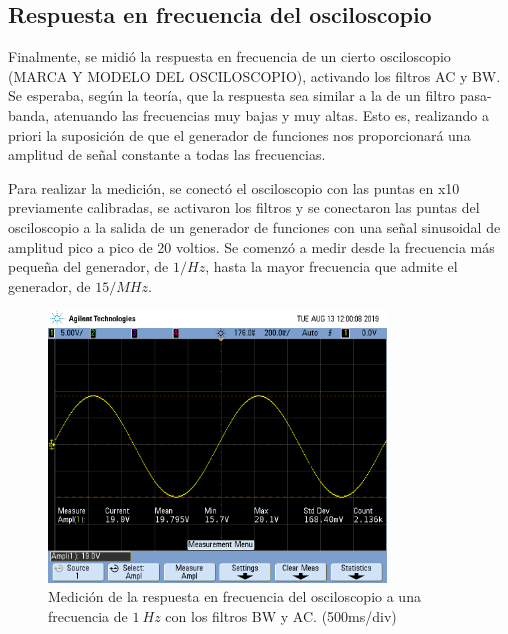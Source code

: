 \documentclass[a4paper]{article}
\begin{document}
\subsection*{Respuesta en frecuencia del osciloscopio}
Finalmente, se midió la respuesta en frecuencia de un cierto osciloscopio (MARCA Y MODELO DEL OSCILOSCOPIO), activando los filtros AC y BW. Se esperaba, según la teoría, que la respuesta sea similar a la de un filtro pasa-banda, atenuando las frecuencias muy bajas y muy altas. Esto es, realizando a priori la suposición de que el generador de funciones nos proporcionará una amplitud de señal constante a todas las frecuencias.

Para realizar la medición, se conectó el osciloscopio con las puntas en x10 previamente calibradas, se activaron los filtros y se conectaron las puntas del osciloscopio a la salida de un generador de funciones con una señal sinusoidal de amplitud pico a pico de 20 voltios. Se comenzó a medir desde la frecuencia más pequeña del generador, de $1 / Hz$, hasta la mayor frecuencia que admite el generador, de $15 / MHz$.

\begin{figure}[H]
	\centering
	\includegraphics[width=0.8\textwidth,trim={0.7cm 5cm  0.5 8cm},clip]{osci1hz.png}
	\caption{Medición de la respuesta en frecuencia del osciloscopio a una frecuencia de $1 \ Hz$ con los filtros BW y AC. (500ms/div)} 
	\label{graf:osci_freq_baja}
\end{figure}
\end{document}
